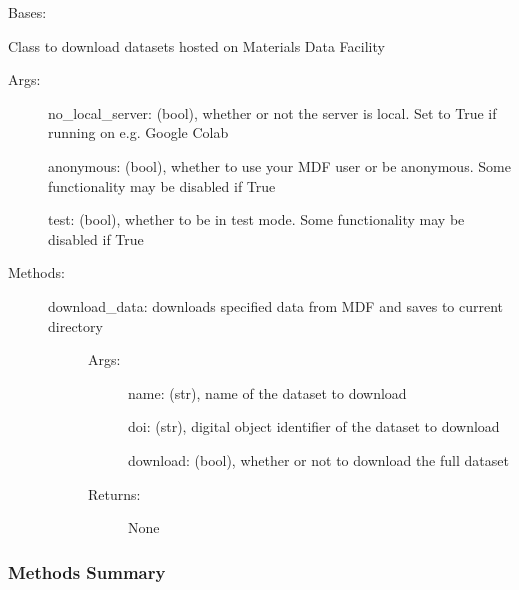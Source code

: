 \documentclass[letterpaper,10pt,english]{sphinxmanual}
\begin{document}
\begin{fulllineitems}
\label{\detokenize{api/mastml.datasets.FoundryDatasets:mastml.datasets.FoundryDatasets}}
Bases: 

Class to download datasets hosted on Materials Data Facility
\begin{description}
\item[{Args:}] \leavevmode
no\_local\_server: (bool), whether or not the server is local. Set to True if running on e.g. Google Colab

anonymous: (bool), whether to use your MDF user or be anonymous. Some functionality may be disabled if True

test: (bool), whether to be in test mode. Some functionality may be disabled if True

\item[{Methods:}] \leavevmode\begin{description}
\item[{download\_data: downloads specified data from MDF and saves to current directory}] \leavevmode\begin{description}
\item[{Args:}] \leavevmode
name: (str), name of the dataset to download

doi: (str), digital object identifier of the dataset to download

download: (bool), whether or not to download the full dataset

\item[{Returns:}] \leavevmode
None

\end{description}

\end{description}

\end{description}
\subsubsection*{Methods Summary}


\begin{savenotes}\sphinxatlongtablestart\begin{longtable}[c]{}
\hline

\endfirsthead


\end{longtable}
\end{savenotes}
\end{fulllineitems}
\end{document}
